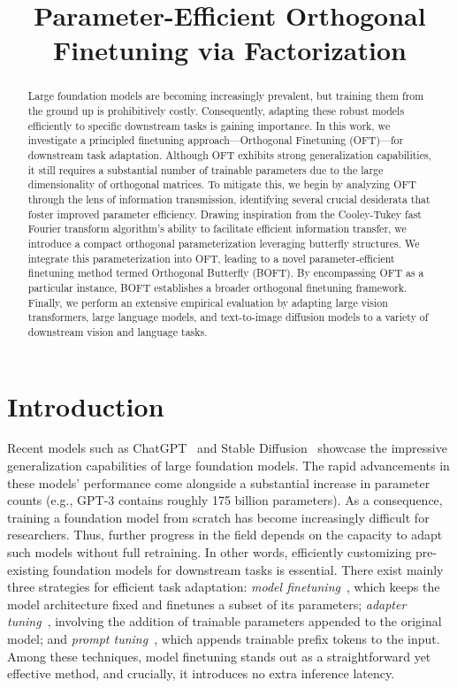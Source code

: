 \title{Parameter-Efficient Orthogonal Finetuning via Factorization}

\begin{abstract}
Large foundation models are becoming increasingly prevalent, but training them from the ground up is prohibitively costly. Consequently, adapting these robust models efficiently to specific downstream tasks is gaining importance. In this work, we investigate a principled finetuning approach—Orthogonal Finetuning (OFT)—for downstream task adaptation. Although OFT exhibits strong generalization capabilities, it still requires a substantial number of trainable parameters due to the large dimensionality of orthogonal matrices. To mitigate this, we begin by analyzing OFT through the lens of information transmission, identifying several crucial desiderata that foster improved parameter efficiency. Drawing inspiration from the Cooley-Tukey fast Fourier transform algorithm's ability to facilitate efficient information transfer, we introduce a compact orthogonal parameterization leveraging butterfly structures. We integrate this parameterization into OFT, leading to a novel parameter-efficient finetuning method termed Orthogonal Butterfly (BOFT). By encompassing OFT as a particular instance, BOFT establishes a broader orthogonal finetuning framework. Finally, we perform an extensive empirical evaluation by adapting large vision transformers, large language models, and text-to-image diffusion models to a variety of downstream vision and language tasks.
\end{abstract}

\section{Introduction}

Recent models such as ChatGPT~\cite{brown2020language,chen2021evaluating} and Stable Diffusion~\cite{rombach2022high} showcase the impressive generalization capabilities of large foundation models. The rapid advancements in these models' performance come alongside a substantial increase in parameter counts (e.g., GPT-3 contains roughly 175 billion parameters). As a consequence, training a foundation model from scratch has become increasingly difficult for researchers. Thus, further progress in the field depends on the capacity to adapt such models without full retraining. In other words, efficiently customizing pre-existing foundation models for downstream tasks is essential. There exist mainly three strategies for efficient task adaptation: \emph{model finetuning}~\cite{hulora2022,zaken2022bitfit,guo2020parameter,raffel2020exploring,qiu2023controlling,zhang2022adaptive,chavan2023one}, which keeps the model architecture fixed and finetunes a subset of its parameters; \emph{adapter tuning}~\cite{rebuffi2017learning,houlsby2019parameter,pfeiffer2020adapterfusion,lin2020exploring,he2021towards}, involving the addition of trainable parameters appended to the original model; and \emph{prompt tuning}~\cite{li2021prefix,lester2021power}, which appends trainable prefix tokens to the input. Among these techniques, model finetuning stands out as a straightforward yet effective method, and crucially, it introduces no extra inference latency.


